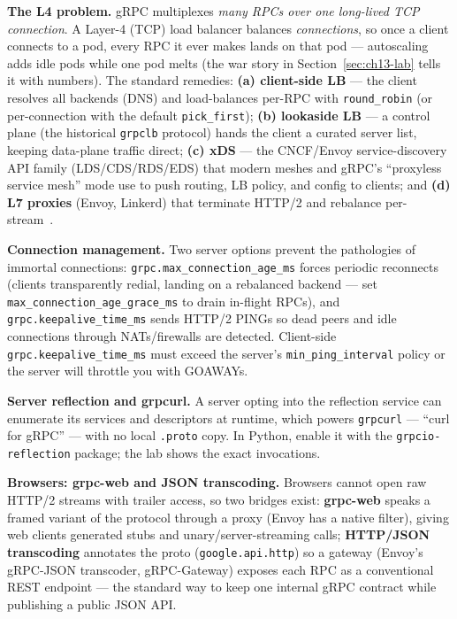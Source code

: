 \textbf{The L4 problem.} gRPC multiplexes \emph{many RPCs over one long-lived
TCP connection}. A Layer-4 (TCP) load balancer balances \emph{connections}, so
once a client connects to a pod, every RPC it ever makes lands on that pod ---
autoscaling adds idle pods while one pod melts (the war story in
Section~\ref{sec:ch13-lab} tells it with numbers). The standard remedies:
\textbf{(a) client-side LB} --- the client resolves all backends (DNS) and
load-balances per-RPC with \texttt{round\_robin} (or per-connection with the
default \texttt{pick\_first}); \textbf{(b) lookaside LB} --- a control plane
(the historical \texttt{grpclb} protocol) hands the client a curated server
list, keeping data-plane traffic direct; \textbf{(c) xDS} --- the CNCF/Envoy
service-discovery API family (LDS/CDS/RDS/EDS) that modern meshes and gRPC's
``proxyless service mesh'' mode use to push routing, LB policy, and config to
clients; and \textbf{(d) L7 proxies} (Envoy, Linkerd) that terminate HTTP/2 and
rebalance per-stream~\cite{grpcdocs,newman2021microservices}.

\textbf{Connection management.} Two server options prevent the pathologies of
immortal connections: \texttt{grpc.max\_connection\_age\_ms} forces periodic
reconnects (clients transparently redial, landing on a rebalanced backend ---
set \texttt{max\_connection\_age\_grace\_ms} to drain in-flight RPCs), and
\texttt{grpc.keepalive\_time\_ms} sends HTTP/2 PINGs so dead peers and idle
connections through NATs/firewalls are detected. Client-side
\texttt{grpc.keepalive\_time\_ms} must exceed the server's
\texttt{min\_ping\_interval} policy or the server will throttle you with
GOAWAYs.

\textbf{Server reflection and grpcurl.} A server opting into the reflection
service can enumerate its services and descriptors at runtime, which powers
\texttt{grpcurl} --- ``curl for gRPC'' --- with no local \texttt{.proto} copy.
In Python, enable it with the \texttt{grpcio-reflection} package; the lab shows
the exact invocations.

\textbf{Browsers: grpc-web and JSON transcoding.} Browsers cannot open raw
HTTP/2 streams with trailer access, so two bridges exist: \textbf{grpc-web}
speaks a framed variant of the protocol through a proxy (Envoy has a native
filter), giving web clients generated stubs and unary/server-streaming calls;
\textbf{HTTP/JSON transcoding} annotates the proto
(\texttt{google.api.http}) so a gateway (Envoy's gRPC-JSON transcoder,
gRPC-Gateway) exposes each RPC as a conventional REST endpoint --- the standard
way to keep one internal gRPC contract while publishing a public JSON API.

